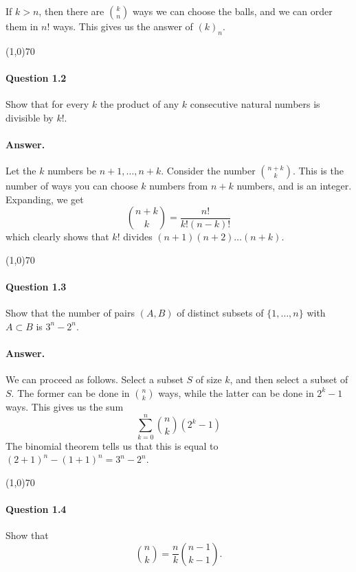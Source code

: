 If $k>n$, then there are $\binom{k}{n}$ ways we can choose the balls, and we can order them in $n!$ ways. This gives us the answer of $(k)_n$.

\begin{center}
	\line(1,0){70}
\end{center}

\paragraph{Question 1.2} Show that for every $k$ the product of any $k$ consecutive natural numbers is divisible by $k!$.

\paragraph{Answer.} Let the $k$ numbers be $n+1,\dots,n+k$. Consider the number $\binom{n+k}{k}$. This is the number of ways you can choose $k$ numbers from $n+k$ numbers, and is an integer. Expanding, we get
$$\binom{n+k}{k}=\frac{n!}{k!(n-k)!}$$
which clearly shows that $k!$ divides $(n+1)(n+2)\dots(n+k)$.

\begin{center}
	\line(1,0){70}
\end{center}

\paragraph{Question 1.3} Show that the number of pairs $(A,B)$ of distinct subsets of $\{1,\dots,n\}$ with $A\subset B$ is $3^n-2^n$.

\paragraph{Answer.} We can proceed as follows. Select a subset $S$ of size $k$, and then select a subset of $S$. The former can be done in $\binom{n}{k}$ ways, while the latter can be done in $2^k-1$ ways. This gives us the sum
$$\sum_{k=0}^n\binom{n}{k}(2^k-1)$$
The binomial theorem tells us that this is equal to $(2+1)^n-(1+1)^n=3^n-2^n$.

\begin{center}
	\line(1,0){70}
\end{center}

\paragraph{Question 1.4} Show that
$$\binom{n}{k}=\frac{n}{k}\binom{n-1}{k-1}.$$

